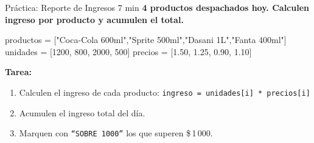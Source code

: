 \documentclass[aspectratio=169, 11pt]{beamer}
\begin{document}
\begin{frame}[fragile,shrink=30]{Práctica: Reporte de Ingresos \hfill {\normalsize\color{arcaRed}\faClock\hspace{4pt}7 min}}
  \vspace{-6pt}
  {\small\color{arcaDark}\bfseries
    4 productos despachados hoy. Calculen ingreso por producto
    y acumulen el total.}

  \vspace{4pt}
  \begin{pyblock}
productos = ["Coca-Cola 600ml","Sprite 500ml","Dasani 1L","Fanta 400ml"]
unidades  = [1200, 800, 2000, 500]
precios   = [1.50, 1.25, 0.90, 1.10]
  \end{pyblock}

  \vspace{3pt}
  {\footnotesize\color{textMuted}
    \textbf{Tarea:}
    \begin{enumerate}\setlength{\itemsep}{2pt}
      \item Calculen el ingreso de cada producto:
        \texttt{ingreso = unidades[i] * precios[i]}
      \item Acumulen el ingreso total del día.
      \item Marquen con \texttt{``SOBRE 1000''} los que superen \$\,1\,000.
    \end{enumerate}
  }
\end{frame}
\end{document}
